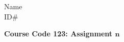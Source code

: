 \documentclass[11pt, oneside]{article}   	%
\begin{document}
 \pagestyle{empty}

\begin{flushright}
Name
\\
ID\#
\end{flushright}

\vspace{12pt}

\begin{center}
\textbf{\Large{Course Code 123: Assignment $\mathbf{n}$}}
\end{center}

\vspace{24pt}

\end{document}

